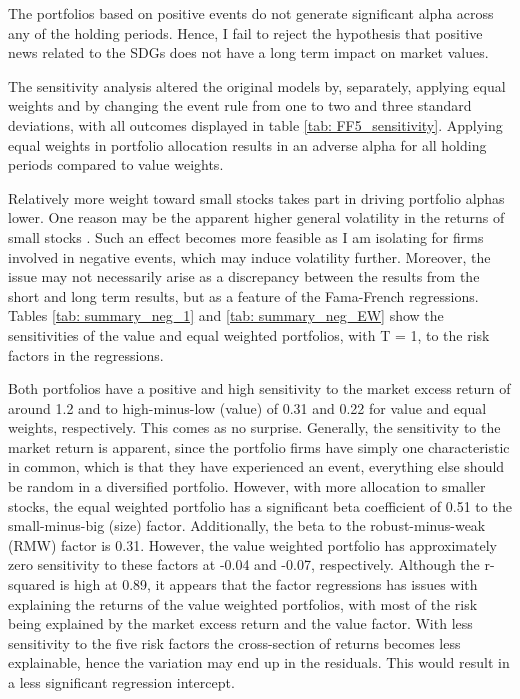 The portfolios based on positive events do not generate significant alpha across any of the holding periods. Hence, I fail to reject the hypothesis that positive news related to the SDGs does not have a long term impact on market values. 

The sensitivity analysis altered the original models by, separately, applying equal weights and by changing the event rule from one to two and three standard deviations, with all outcomes displayed in table \ref{tab: FF5_sensitivity}. Applying equal weights in portfolio allocation results in an adverse alpha for all holding periods compared to value weights. 

Relatively more weight toward small stocks takes part in driving portfolio alphas lower. One reason may be the apparent higher general volatility in the returns of small stocks \citep{Fama_french_3fac}. Such an effect becomes more feasible as I am isolating for firms involved in negative events, which may induce volatility further. Moreover, the issue may not necessarily arise as a discrepancy between the results from the short and long term results, but as a feature of the Fama-French regressions. Tables \ref{tab: summary_neg_1} and \ref{tab: summary_neg_EW} show the sensitivities of the value and equal weighted portfolios, with T = 1, to the risk factors in the regressions. 

Both portfolios have a positive and high sensitivity to the market excess return of around 1.2 and to high-minus-low (value) of 0.31 and 0.22 for value and equal weights, respectively. This comes as no surprise. Generally, the sensitivity to the market return is apparent, since the portfolio firms have simply one characteristic in common, which is that they have experienced an event, everything else should be random in a diversified portfolio. However, with more allocation to smaller stocks, the equal weighted portfolio has a significant beta coefficient of 0.51 to the small-minus-big (size) factor. Additionally, the beta to the robust-minus-weak (RMW) factor is 0.31. However, the value weighted portfolio has approximately zero sensitivity to these factors at -0.04 and -0.07, respectively. Although the r-squared is high at 0.89, it appears that the factor regressions has issues with explaining the returns of the value weighted portfolios, with most of the risk being explained by the market excess return and the value factor. With less sensitivity to the five risk factors the cross-section of returns becomes less explainable, hence the variation may end up in the residuals. This would result in a less significant regression intercept.  

